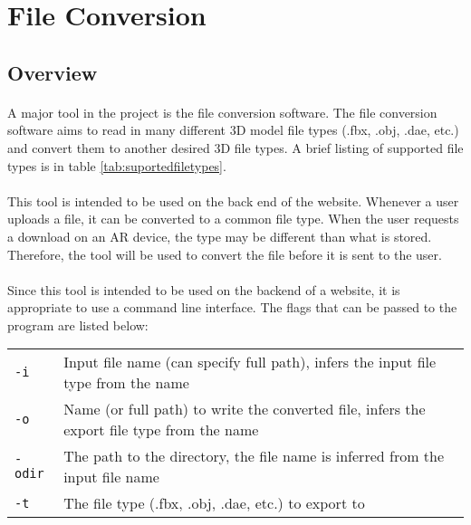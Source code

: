 
 \section{File Conversion}

    \subsection{Overview}
    \paragraph{}
    A major tool in the project is the file conversion software.  
    The file conversion software aims to read in many different 3D model file types (.fbx, .obj, .dae, etc.) and convert them to another desired 3D file types.  
    A brief listing of supported file types is in table \ref{tab:suportedfiletypes}.
    
    \paragraph{}
    This tool is intended to be used on the back end of the website.  Whenever a user uploads a file, it can be converted to a common file type.
    When the user requests a download on an AR device, the type may be different than what is stored. Therefore, the tool will be used to convert the file before
    it is sent to the user.
    
    \paragraph{}
    Since this tool is intended to be used on the backend of a website, it is appropriate to use a command line interface.  
    The flags that can be passed to the program are listed below:
    
    \begin{table}[h]
        \centering
        \begin{tabular}{l  l}
            \texttt{-i} & Input file name (can specify full path), infers the input file type from the name \\
            \texttt{-o} & Name (or full path) to write the converted file, infers the export file type from the name \\
            \texttt{-odir} & The path to the directory, the file name is inferred from the input file name \\
            \texttt{-t} & The file type (.fbx, .obj, .dae, etc.) to export to
        \end{tabular}
    \end{table}
    
